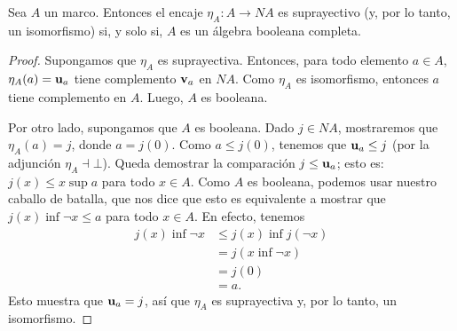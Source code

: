 \begin{thm}
  \label{thm:ensamble-booleanidad}
  Sea $A$ un marco.
  Entonces el encaje $\eta_A:A\to NA$ es suprayectivo (y, por lo
  tanto, un isomorfismo) si, y solo
  si, $A$ es un álgebra booleana completa.
\end{thm}
\begin{proof}
    Supongamos que $\eta_A$ es suprayectiva.
    Entonces, para todo elemento $a\in A$,
    $\eta_A(a)=\mathbf u_{a}$ tiene complemento $\mathbf v_{a}$ en $NA$.
    Como $\eta_A$ es isomorfismo, entonces
    $a$ tiene complemento en $A$.
    Luego, $A$ es booleana.
    
    Por otro lado, supongamos que $A$ es booleana.
    Dado $j\in NA$, mostraremos que $\eta_A(a)=j$,
    donde $a=j(0)$.
    Como $a\leq j(0)$, tenemos que $\mathbf u_{a}\leq j$
    (por la adjunción $\eta_A\dashv\bot$).
    Queda demostrar la comparación $j\leq\mathbf u_{a}$;
    esto es: $j(x)\leq x\sup a$ para todo $x\in A$.
    Como $A$ es booleana, podemos usar nuestro
    caballo de batalla, que nos dice que esto es equivalente
    a mostrar que $j(x)\inf\neg x\leq a$ para todo $x\in A$.
    En efecto, tenemos
    \begin{align*}
        j(x)\inf\neg x
        &\leq j(x)\inf j(\neg x) \\
        &= j(x\inf\neg x) \\
        &= j(0) \\
        &= a.
    \end{align*}
    Esto muestra que $\mathbf u_{a}=j$,
    así que $\eta_A$ es suprayectiva y,
    por lo tanto, un isomorfismo.
\end{proof}


